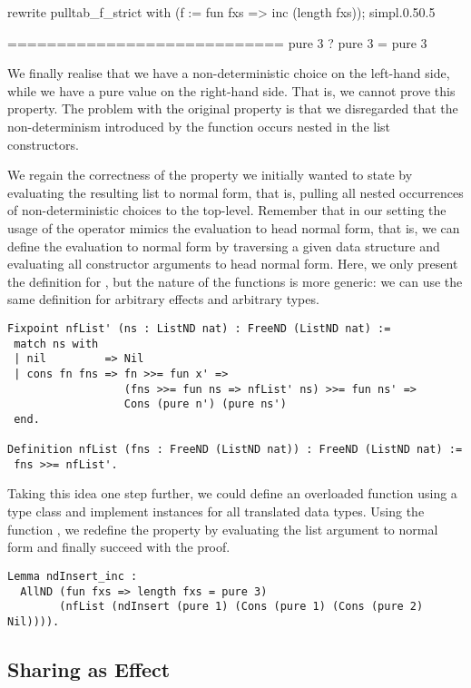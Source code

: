 \begin{cproof1}{rewrite pulltab_f_strict with (f := fun fxs => inc (length fxs)); simpl.}{0.5}{0.5}

  ============================
  pure 3 ? pure 3 = pure 3
\end{cproof1}

We finally realise that we have a non\--deterministic choice on the left\--hand side, while we have a pure value on the right\--hand side.
That is, we cannot prove this property.
The problem with the original property is that we disregarded that the non\--determinism introduced by the function  occurs nested in the list constructors.

We regain the correctness of the property we initially wanted to state by evaluating the resulting list to normal form, that is, pulling all nested occurrences of non\--deterministic choices to the top\--level.
Remember that in our setting the usage of the operator \cinl{>>=} mimics the evaluation to head normal form, that is, we can define the evaluation to normal form by traversing a given data structure and evaluating all constructor arguments to head normal form.
Here, we only present the definition for , but the nature of the functions is more generic: we can use the same definition for arbitrary effects and arbitrary types.

\begin{verbatim}
Fixpoint nfList' (ns : ListND nat) : FreeND (ListND nat) :=
 match ns with
 | nil         => Nil
 | cons fn fns => fn >>= fun x' =>
                  (fns >>= fun ns => nfList' ns) >>= fun ns' =>
                  Cons (pure n') (pure ns')
 end.

Definition nfList (fns : FreeND (ListND nat)) : FreeND (ListND nat) :=
 fns >>= nfList'.
\end{verbatim}

Taking this idea one step further, we could define an overloaded function  using a type class and implement instances for all translated data types.
Using the function , we redefine the property by evaluating the list argument to normal form and finally succeed with the proof.

\begin{verbatim}
Lemma ndInsert_inc :
  AllND (fun fxs => length fxs = pure 3)
        (nfList (ndInsert (pure 1) (Cons (pure 1) (Cons (pure 2) Nil)))).
\end{verbatim}

\subsection{Sharing as Effect}
\label{subsec:sharingEffect}

